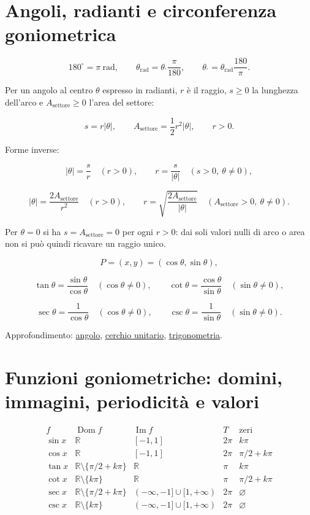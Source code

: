 \section{Angoli, radianti e circonferenza goniometrica}\label{angoli-radianti-e-circonferenza-goniometrica}

\[
180^\circ=\pi\ \mathrm{rad},
\qquad
\theta_{\mathrm{rad}}=\theta_{^\circ}\frac\pi{180},
\qquad
\theta_{^\circ}=\theta_{\mathrm{rad}}\frac{180}{\pi}.
\]

Per un angolo al centro \(\theta\) espresso in radianti, \(r\) è il raggio, \(s\ge0\) la lunghezza dell'arco e \(A_{\mathrm{settore}}\ge0\) l'area del settore:

\[
s=r|\theta|,
\qquad
A_{\mathrm{settore}}=\frac12r^2|\theta|,
\qquad r>0.
\]

Forme inverse:

\[
|\theta|=\frac sr\quad(r>0),
\qquad
r=\frac{s}{|\theta|}\quad(s>0,\ \theta\ne0),
\]

\[
|\theta|=\frac{2A_{\mathrm{settore}}}{r^2}\quad(r>0),
\qquad
r=\sqrt{\frac{2A_{\mathrm{settore}}}{|\theta|}}
\quad(A_{\mathrm{settore}}>0,\ \theta\ne0).
\]

Per \(\theta=0\) si ha \(s=A_{\mathrm{settore}}=0\) per ogni \(r>0\): dai soli valori nulli di arco o area non si può quindi ricavare un raggio unico.

\[
P=(x,y)=(\cos\theta,\sin\theta),
\]

\[
\tan\theta=\frac{\sin\theta}{\cos\theta}
\quad(\cos\theta\ne0),
\qquad
\cot\theta=\frac{\cos\theta}{\sin\theta}
\quad(\sin\theta\ne0),
\]

\[
\sec\theta=\frac1{\cos\theta}
\quad(\cos\theta\ne0),
\qquad
\csc\theta=\frac1{\sin\theta}
\quad(\sin\theta\ne0).
\]

Approfondimento: \href{https://ingegnerismo.it/matematica/angolo/}{angolo}, \href{https://ingegnerismo.it/matematica/cerchio-unitario/}{cerchio unitario}, \href{https://ingegnerismo.it/matematica/trigonometria/}{trigonometria}.

\section{Funzioni goniometriche: domini, immagini, periodicità e valori}\label{funzioni-goniometriche-domini-immagini-periodicituxe0-e-valori}

\[
\begin{array}{c|c|c|c|c}
f&\operatorname{Dom}f&\operatorname{Im}f&T&\text{zeri}\\
\hline
\sin x&\mathbb R&[-1,1]&2\pi&k\pi\\
\cos x&\mathbb R&[-1,1]&2\pi&\pi/2+k\pi\\
\tan x&\mathbb R\setminus\{\pi/2+k\pi\}&\mathbb R&\pi&k\pi\\
\cot x&\mathbb R\setminus\{k\pi\}&\mathbb R&\pi&\pi/2+k\pi\\
\sec x&\mathbb R\setminus\{\pi/2+k\pi\}&(-\infty,-1]\cup[1,+\infty)&2\pi&\varnothing\\
\csc x&\mathbb R\setminus\{k\pi\}&(-\infty,-1]\cup[1,+\infty)&2\pi&\varnothing
\end{array}
\]

